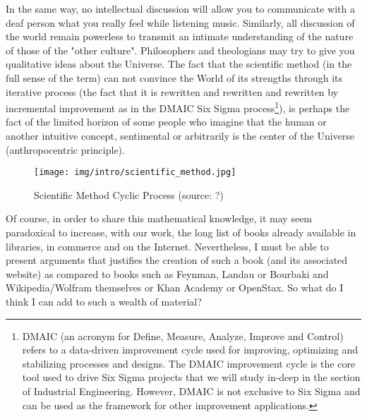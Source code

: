 	In the same way, no intellectual discussion will allow you to communicate with a deaf person what you really feel while listening music. Similarly, all discussion of the world remain powerless to transmit an intimate understanding of the nature of those of the "other culture". Philosophers and theologians may try to give you qualitative ideas about the Universe. The fact that the scientific method (in the full sense of the term) can not convince the World of its strengths through its iterative process (the fact that it is rewritten and rewritten and rewritten by incremental improvement as in the DMAIC Six Sigma process\footnote{DMAIC (an acronym for Define, Measure, Analyze, Improve and Control) refers to a data-driven improvement cycle used for improving, optimizing and stabilizing processes and designs. The DMAIC improvement cycle is the core tool used to drive Six Sigma projects that we will study in-deep in the section of Industrial Engineering. However, DMAIC is not exclusive to Six Sigma and can be used as the framework for other improvement applications.}), is perhaps the fact of the limited horizon of some people who imagine that the human or another intuitive concept, sentimental or arbitrarily is the center of the Universe (anthropocentric principle).
	\begin{figure}[H]
		\centering
		\texttt{[image: img/intro/scientific\_method.jpg]}
		\caption[Scientific Method Cyclic Process]{Scientific Method Cyclic Process (source: ?)}
	\end{figure}
	Of course, in order to share this mathematical knowledge, it may seem paradoxical to increase, with our work, the long list of books already available in libraries, in commerce and on the Internet. Nevertheless, I must be able to present arguments that justifies the creation of such a book (and its associated website) as compared to books such as Feynman, Landau or Bourbaki and Wikipedia/Wolfram themselves or Khan Academy or OpenStax. So what do I think I can add to such a wealth of material? 
